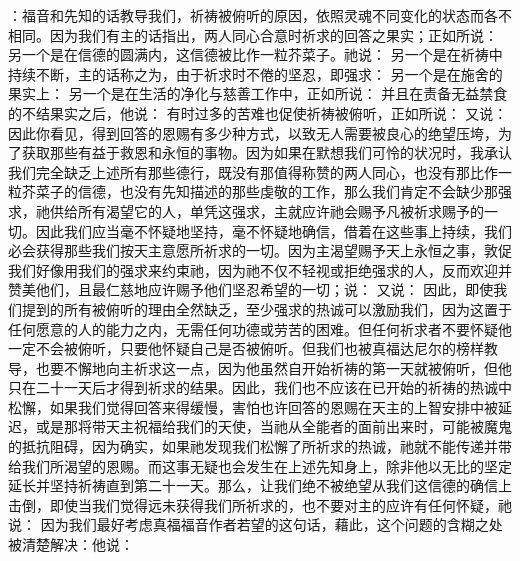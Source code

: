 ：福音和先知的话教导我们，祈祷被俯听的原因，依照灵魂不同变化的状态而各不相同。因为我们有主的话指出，两人同心合意时祈求的回答之果实；正如所说： 另一个是在信德的圆满内，这信德被比作一粒芥菜子。祂说： 另一个是在祈祷中持续不断，主的话称之为，由于祈求时不倦的坚忍，即强求： 另一个是在施舍的果实上： 另一个是在生活的净化与慈善工作中，正如所说： 并且在责备无益禁食的不结果实之后，他说： 有时过多的苦难也促使祈祷被俯听，正如所说： 又说： 因此你看见，得到回答的恩赐有多少种方式，以致无人需要被良心的绝望压垮，为了获取那些有益于救恩和永恒的事物。因为如果在默想我们可怜的状况时，我承认我们完全缺乏上述所有那些德行，既没有那值得称赞的两人同心，也没有那比作一粒芥菜子的信德，也没有先知描述的那些虔敬的工作，那么我们肯定不会缺少那强求，祂供给所有渴望它的人，单凭这强求，主就应许祂会赐予凡被祈求赐予的一切。因此我们应当毫不怀疑地坚持，毫不怀疑地确信，借着在这些事上持续，我们必会获得那些我们按天主意愿所祈求的一切。因为主渴望赐予天上永恒之事，敦促我们好像用我们的强求来约束祂，因为祂不仅不轻视或拒绝强求的人，反而欢迎并赞美他们，且最仁慈地应许赐予他们坚忍希望的一切；说： 又说： 因此，即使我们提到的所有被俯听的理由全然缺乏，至少强求的热诚可以激励我们，因为这置于任何愿意的人的能力之内，无需任何功德或劳苦的困难。但任何祈求者不要怀疑他一定不会被俯听，只要他怀疑自己是否被俯听。但我们也被真福达尼尔的榜样教导，也要不懈地向主祈求这一点，因为他虽然自开始祈祷的第一天就被俯听，但他只在二十一天后才得到祈求的结果。因此，我们也不应该在已开始的祈祷的热诚中松懈，如果我们觉得回答来得缓慢，害怕也许回答的恩赐在天主的上智安排中被延迟，或是那将带天主祝福给我们的天使，当祂从全能者的面前出来时，可能被魔鬼的抵抗阻碍，因为确实，如果祂发现我们松懈了所祈求的热诚，祂就不能传递并带给我们所渴望的恩赐。而这事无疑也会发生在上述先知身上，除非他以无比的坚定延长并坚持祈祷直到第二十一天。那么，让我们绝不被绝望从我们这信德的确信上击倒，即使当我们觉得远未获得我们所祈求的，也不要对主的应许有任何怀疑，祂说： 因为我们最好考虑真福福音作者若望的这句话，藉此，这个问题的含糊之处被清楚解决：他说： 